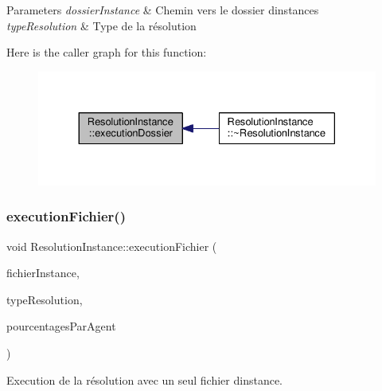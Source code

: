 \begin{DoxyParams}{Parameters}
{\em dossier\+Instance} & Chemin vers le dossier d\textquotesingle{}instances \\
\hline
{\em type\+Resolution} & Type de la résolution \\
\hline
\end{DoxyParams}
Here is the caller graph for this function\+:\nopagebreak
\begin{figure}[H]
\begin{center}
\leavevmode
\includegraphics[width=330pt]{classResolutionInstance_a741ee2ea81859379e1418974029f9699_icgraph}
\end{center}
\end{figure}
\mbox{\label{classResolutionInstance_a1b922870d569b5a6056c4fb2543ec3d6}} 
\subsubsection{\texorpdfstring{execution\+Fichier()}{executionFichier()}}
{\footnotesize\ttfamily void Resolution\+Instance\+::execution\+Fichier (\begin{DoxyParamCaption}\item[{Q\+String}]{fichier\+Instance,  }\item[{Q\+String}]{type\+Resolution,  }\item[{map$<$ unsigned int, unsigned int $>$}]{pourcentages\+Par\+Agent }\end{DoxyParamCaption})}



Execution de la résolution avec un seul fichier d\textquotesingle{}instance. 


